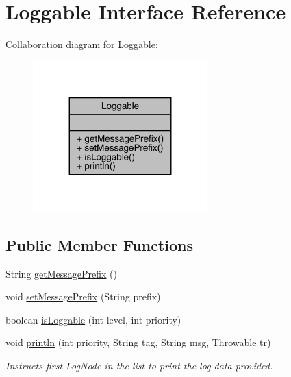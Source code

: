 \hypertarget{interfacecom_1_1toast_1_1android_1_1gamebase_1_1base_1_1log_1_1_loggable}{}\section{Loggable Interface Reference}
\label{interfacecom_1_1toast_1_1android_1_1gamebase_1_1base_1_1log_1_1_loggable}


Collaboration diagram for Loggable\+:
\nopagebreak
\begin{figure}[H]
\begin{center}
\leavevmode
\includegraphics[width=191pt]{interfacecom_1_1toast_1_1android_1_1gamebase_1_1base_1_1log_1_1_loggable__coll__graph}
\end{center}
\end{figure}
\subsection*{Public Member Functions}
\begin{DoxyCompactItemize}
\item 
String \hyperlink{interfacecom_1_1toast_1_1android_1_1gamebase_1_1base_1_1log_1_1_loggable_a8035d45f6ff47f663cd9c4220620d2e9}{get\+Message\+Prefix} ()
\item 
void \hyperlink{interfacecom_1_1toast_1_1android_1_1gamebase_1_1base_1_1log_1_1_loggable_a16862458952f90c6a6b0a43119aeeafc}{set\+Message\+Prefix} (String prefix)
\item 
boolean \hyperlink{interfacecom_1_1toast_1_1android_1_1gamebase_1_1base_1_1log_1_1_loggable_ae2a866830adbdc50eb134bb313859c7e}{is\+Loggable} (int level, int priority)
\item 
void \hyperlink{interfacecom_1_1toast_1_1android_1_1gamebase_1_1base_1_1log_1_1_loggable_a3eda0a47ad01e3e0668cbf6dafc14db2}{println} (int priority, String tag, String msg, Throwable tr)
\begin{DoxyCompactList}\small\item\em Instructs first Log\+Node in the list to print the log data provided. \end{DoxyCompactList}\end{DoxyCompactItemize}


